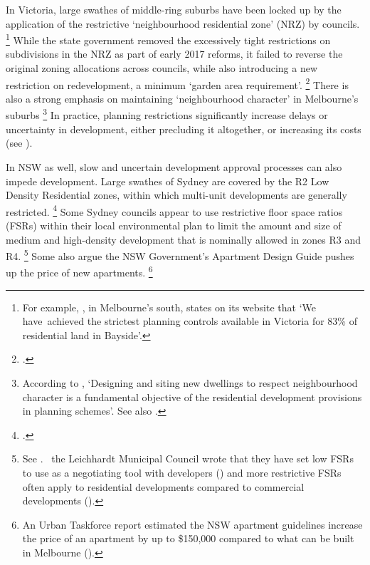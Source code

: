 In Victoria, large swathes of middle-ring suburbs have been locked up by the application of the restrictive `neighbourhood residential zone' (NRZ) by councils.%
    \footnote{\textcites{VICDepEnvironLWP2017}
	For example, \textcite{BaysideHousing2017}, in Melbourne's south, states on its website that `We have~achieved the strictest planning controls available in Victoria for 83\% of residential land in Bayside'.}
While the state government removed the excessively tight restrictions on subdivisions in the NRZ as part of early 2017 reforms, it failed to reverse the original zoning allocations across councils, while also introducing a new restriction on redevelopment, a minimum `garden area requirement'.%
	\footcite{VICDepEnvironLWP2017}
There is also a strong emphasis on maintaining `neighbourhood character' in Melbourne's suburbs%
    \footnote{According to \textcite{VICDepLWP2017Neighbour}, `Designing and siting new dwellings to respect neighbourhood character is a fundamental objective of the residential development provisions in planning schemes'.
    See also \textcites[][91]{Rowley_2017_Vic_planning_system}{Dutta2017Subdivisions}{DoveyEtAl2009Neighbourhood}{Newton-2017-becoming-urban}.}
In practice, planning restrictions significantly increase delays or uncertainty in development, either precluding it altogether, or increasing its costs (see ).

In NSW as well, slow and uncertain development approval processes can also impede development.
Large swathes of Sydney are covered by the R2 Low Density Residential zones, within which multi-unit developments are generally restricted.%
    \footcite{PWC2017sydneyaffordabilitycrisis}
Some Sydney councils appear to use restrictive floor space ratios (FSRs) within their local environmental plan to limit the amount and size of medium and high-density development that is nominally allowed in zones R3 and R4.%
	\footnote{See \textcite{Daley-etal-2017-Submission-NSW-housing-supply-inquiry}.
	\eg~the Leichhardt Municipal Council wrote that they have set low FSRs to use as a negotiating tool with developers (\textcite{Leichhardt2014}) and more restrictive FSRs often apply to residential developments compared to commercial developments (\textcite[][28]{UrbanTaskforce2011}).}
Some also argue the NSW Government's Apartment Design Guide pushes up the price of new apartments.%
    \footnote{An Urban Taskforce report estimated  the NSW apartment guidelines increase the price of an apartment by up to \$150,000 compared to what can be built in Melbourne (\textcite{urbantaskforce2017apartments}).}

